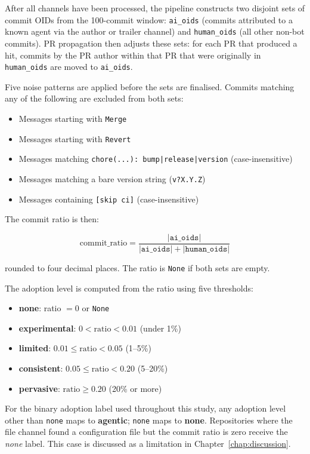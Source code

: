 After all channels have been processed, the pipeline constructs two disjoint sets of commit OIDs from the 100-commit window: \texttt{ai\_oids} (commits attributed to a known agent via the author or trailer channel) and \texttt{human\_oids} (all other non-bot commits). PR propagation then adjusts these sets: for each PR that produced a hit, commits by the PR author within that PR that were originally in \texttt{human\_oids} are moved to \texttt{ai\_oids}.

Five noise patterns are applied before the sets are finalised. Commits matching any of the following are excluded from both sets:
\begin{itemize}
  \item Messages starting with \texttt{Merge }
  \item Messages starting with \texttt{Revert }
  \item Messages matching \texttt{chore(...): bump|release|version} (case-insensitive)
  \item Messages matching a bare version string (\texttt{v?X.Y.Z})
  \item Messages containing \texttt{[skip ci]} (case-insensitive)
\end{itemize}

The commit ratio is then:

\[
\text{commit\_ratio} = \frac{|\texttt{ai\_oids}|}{|\texttt{ai\_oids}| + |\texttt{human\_oids}|}
\]

rounded to four decimal places. The ratio is \texttt{None} if both sets are empty.

The adoption level is computed from the ratio using five thresholds:

\begin{itemize}
  \item \textbf{none}: ratio $= 0$ or \texttt{None}
  \item \textbf{experimental}: $0 < \text{ratio} < 0.01$ (under 1\%)
  \item \textbf{limited}: $0.01 \leq \text{ratio} < 0.05$ (1--5\%)
  \item \textbf{consistent}: $0.05 \leq \text{ratio} < 0.20$ (5--20\%)
  \item \textbf{pervasive}: $\text{ratio} \geq 0.20$ (20\% or more)
\end{itemize}

For the binary adoption label used throughout this study, any adoption level other than \texttt{none} maps to \textbf{agentic}; \texttt{none} maps to \textbf{none}. Repositories where the file channel found a configuration file but the commit ratio is zero receive the \textit{none} label. This case is discussed as a limitation in Chapter~\ref{chap:discussion}.

